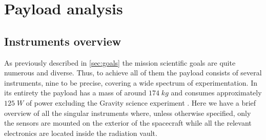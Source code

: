 \pagebreak
\section{Payload analysis}
\label{sec:payload}

\subsection{Instruments overview}
As previously described in \autoref{sec:goals} the mission scientific goals are quite numerous and diverse. Thus, to achieve all of them the payload consists of several instruments, nine to be precise, covering a wide spectrum of experimentation. In its entirety the payload has a mass of around $174 \;kg$ and consumes approximately $125 \;W$ of power excluding the Gravity science experiment \cite{Key_requirements}.
Here we have a brief overview of all the singular instruments where, unless otherwise specified, only the sensors are mounted on the exterior of the spacecraft while all the relevant electronics are located inside the radiation vault. 

